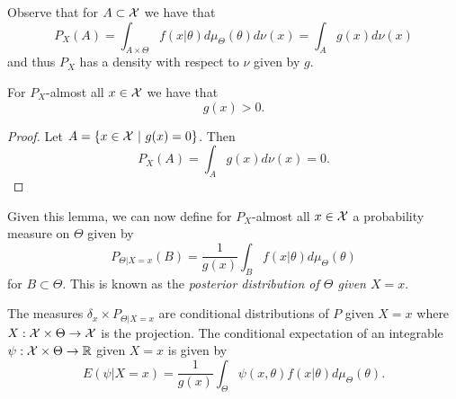 \documentclass[twoside, a4paper, 10pt]{amsart}
\begin{document}
Observe that for $A \subset \mathcal{X}$ we have that $$P_X(A) = \int_{A \times \Theta} f(x|\theta) d\mu_{\Theta}(\theta) d\nu(x) = \int_{A} g(x) d\nu(x)$$ and thus $P_X$ has a density with respect to $\nu$ given by $g$.
\begin{lemma}\label{lemma: denom non-zero almost surely} For $P_X$-almost all $x \in \mathcal{X} $ we have that $$g(x)  > 0.$$

\end{lemma}

\begin{proof} Let $A = \{x \in \mathcal{X} ~|~ g(x) = 0 \}$. Then $$P_X(A) = \int_{A} g(x) d\nu(x) = 0.  $$

\end{proof}

Given this lemma, we can now define for $P_X$-almost all $x \in \mathcal{X}$ a probability measure on $\Theta$ given by $$P_{\Theta|X=x}(B) = \frac{1}{g(x)} \int_{B} f(x|\theta) d\mu_{\Theta}(\theta)$$ for $B \subset \Theta$. This is known as the \textit{posterior distribution of $\Theta$ given $X = x$}.

\begin{lemma} The measures $\delta_x \times P_{\Theta |X=x}$ are conditional distributions of $P$ given $X=x$ where $X:\mathcal{X} \times \Theta \to \mathcal{X}$ is the projection. The conditional expectation of an integrable $\psi:\mathcal{X} \times \Theta \to \mathbb{R}$ given $X=x$ is given by $$E(\psi | X=x) = \frac{1}{g(x)}\int_{\Theta} \psi(x,\theta) f(x|\theta) d\mu_{\Theta}(\theta).$$ 

\end{lemma}
\end{document}
